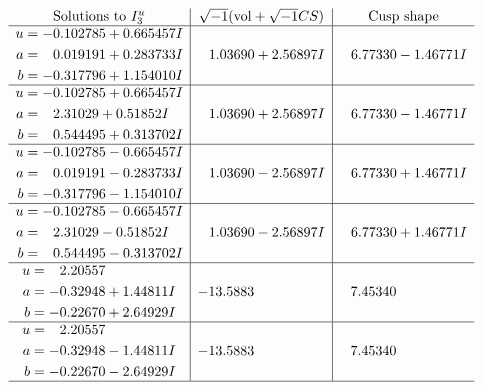 \documentclass[1p]{elsarticle_modified}
\theoremstyle{definition}
\newcommand{\I}{\sqrt{-1}}
\begin{document}
$$\begin{array}{c|c|c}  
\text{Solutions to }I^u_{3}& \I (\text{vol} + \sqrt{-1}CS) & \text{Cusp shape}\\
 \hline 
\begin{aligned}
u &= -0.102785 + 0.665457 I \\
a &= \phantom{-}0.019191 + 0.283733 I \\
b &= -0.317796 + 1.154010 I\end{aligned}
 & \phantom{-}1.03690 + 2.56897 I & \phantom{-}6.77330 - 1.46771 I \\ \hline\begin{aligned}
u &= -0.102785 + 0.665457 I \\
a &= \phantom{-}2.31029 + 0.51852 I \\
b &= \phantom{-}0.544495 + 0.313702 I\end{aligned}
 & \phantom{-}1.03690 + 2.56897 I & \phantom{-}6.77330 - 1.46771 I \\ \hline\begin{aligned}
u &= -0.102785 - 0.665457 I \\
a &= \phantom{-}0.019191 - 0.283733 I \\
b &= -0.317796 - 1.154010 I\end{aligned}
 & \phantom{-}1.03690 - 2.56897 I & \phantom{-}6.77330 + 1.46771 I \\ \hline\begin{aligned}
u &= -0.102785 - 0.665457 I \\
a &= \phantom{-}2.31029 - 0.51852 I \\
b &= \phantom{-}0.544495 - 0.313702 I\end{aligned}
 & \phantom{-}1.03690 - 2.56897 I & \phantom{-}6.77330 + 1.46771 I \\ \hline\begin{aligned}
u &= \phantom{-}2.20557\phantom{ +0.000000I} \\
a &= -0.32948 + 1.44811 I \\
b &= -0.22670 + 2.64929 I\end{aligned}
 & -13.5883\phantom{ +0.000000I} & \phantom{-}7.45340\phantom{ +0.000000I} \\ \hline\begin{aligned}
u &= \phantom{-}2.20557\phantom{ +0.000000I} \\
a &= -0.32948 - 1.44811 I \\
b &= -0.22670 - 2.64929 I\end{aligned}
 & -13.5883\phantom{ +0.000000I} & \phantom{-}7.45340\phantom{ +0.000000I}\\
 \hline 
 \end{array}$$\newpage\newpage\renewcommand{\arraystretch}{1}
\end{document}
